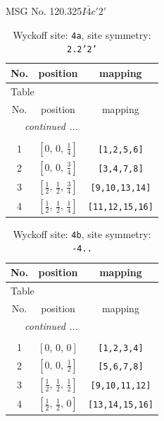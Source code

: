 \documentclass[fleqn,8pt]{jsarticle}
\begin{document}
\setcounter{MaxMatrixCols}{32}

\renewcommand{\tablename}{Table~}
\renewcommand{\figurename}{Figure~}
\begin{center}
\LARGE
MSG No. 120.325\quad$I\bar{4}c'2'$
\end{center}
\renewcommand{\arraystretch}{1.2}
\begin{longtable}{ccc}
\caption{Wyckoff site: {\tt 4a}, site symmetry: {\tt 2.2'2'}}
 \\
 \hline \hline
No. & position & mapping \\ \hline \endfirsthead

\multicolumn{2}{l}{\tablename\ \thetable{}} \\
 \hline \hline
No. & position & mapping \\ \hline \endhead

 \hline \hline
\multicolumn{2}{r}{\footnotesize\it continued ...} \\ \endfoot

 \hline \hline
\multicolumn{2}{r}{} \\ \endlastfoot

1 & $\left[ 0,\, 0,\, \frac{1}{4} \right]$ & {\tt [1,2,5,6]} \\ \hline
2 & $\left[ 0,\, 0,\, \frac{3}{4} \right]$ & {\tt [3,4,7,8]} \\ \hline
3 & $\left[ \frac{1}{2},\, \frac{1}{2},\, \frac{3}{4} \right]$ & {\tt [9,10,13,14]} \\ \hline
4 & $\left[ \frac{1}{2},\, \frac{1}{2},\, \frac{1}{4} \right]$ & {\tt [11,12,15,16]} \\
\end{longtable}
\renewcommand{\arraystretch}{1.2}
\begin{longtable}{ccc}
\caption{Wyckoff site: {\tt 4b}, site symmetry: {\tt -4..}}
 \\
 \hline \hline
No. & position & mapping \\ \hline \endfirsthead

\multicolumn{2}{l}{\tablename\ \thetable{}} \\
 \hline \hline
No. & position & mapping \\ \hline \endhead

 \hline \hline
\multicolumn{2}{r}{\footnotesize\it continued ...} \\ \endfoot

 \hline \hline
\multicolumn{2}{r}{} \\ \endlastfoot

1 & $\left[ 0,\, 0,\, 0 \right]$ & {\tt [1,2,3,4]} \\ \hline
2 & $\left[ 0,\, 0,\, \frac{1}{2} \right]$ & {\tt [5,6,7,8]} \\ \hline
3 & $\left[ \frac{1}{2},\, \frac{1}{2},\, \frac{1}{2} \right]$ & {\tt [9,10,11,12]} \\ \hline
4 & $\left[ \frac{1}{2},\, \frac{1}{2},\, 0 \right]$ & {\tt [13,14,15,16]} \\
\end{longtable}
\end{document}
